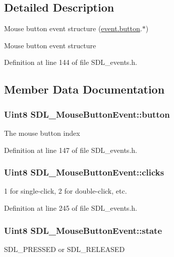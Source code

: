 \subsection{Detailed Description}
Mouse button event structure (\hyperlink{unionSDL__Event_ab6da2fa2687e5f849f270adecc64785f}{event.\+button}.$\ast$) 

Mouse button event structure 

Definition at line 144 of file S\+D\+L\+\_\+events.\+h.



\subsection{Member Data Documentation}
\hypertarget{structSDL__MouseButtonEvent_a1a4680e19ae06d02d2093f0bcba1b24c}{
\subsubsection[{button}]{\setlength{\rightskip}{0pt plus 5cm}Uint8 S\+D\+L\+\_\+\+Mouse\+Button\+Event\+::button}}\label{structSDL__MouseButtonEvent_a1a4680e19ae06d02d2093f0bcba1b24c}
The mouse button index 

Definition at line 147 of file S\+D\+L\+\_\+events.\+h.

\hypertarget{structSDL__MouseButtonEvent_aa606bebcbc3ffc7e932016039c2a36a1}{
\subsubsection[{clicks}]{\setlength{\rightskip}{0pt plus 5cm}Uint8 S\+D\+L\+\_\+\+Mouse\+Button\+Event\+::clicks}}\label{structSDL__MouseButtonEvent_aa606bebcbc3ffc7e932016039c2a36a1}
1 for single-\/click, 2 for double-\/click, etc. 

Definition at line 245 of file S\+D\+L\+\_\+events.\+h.

\hypertarget{structSDL__MouseButtonEvent_a8809cef85cfffad4f2059f2ba4fc6a3d}{
\subsubsection[{state}]{\setlength{\rightskip}{0pt plus 5cm}Uint8 S\+D\+L\+\_\+\+Mouse\+Button\+Event\+::state}}\label{structSDL__MouseButtonEvent_a8809cef85cfffad4f2059f2ba4fc6a3d}
S\+D\+L\+\_\+\+P\+R\+E\+S\+S\+E\+D or S\+D\+L\+\_\+\+R\+E\+L\+E\+A\+S\+E\+D


